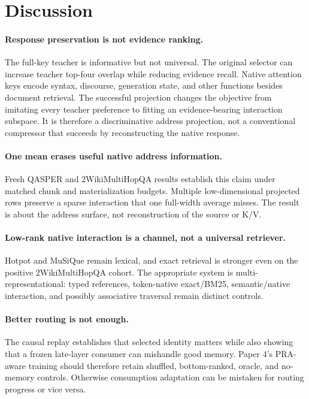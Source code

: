 \documentclass[11pt]{article}
\newcommand{\kv}{\textsc{K/V}\xspace}
\newcommand{\twowiki}{2WikiMultiHopQA\xspace}
\newcommand{\musique}{MuSiQue\xspace}
\begin{document}
\section{Discussion}
\paragraph{Response preservation is not evidence ranking.}
The full-key teacher is informative but not universal. The original selector
can increase teacher top-four overlap while reducing evidence recall. Native
attention keys encode syntax, discourse, generation state, and other functions
besides document retrieval. The successful projection changes the objective
from imitating every teacher preference to fitting an evidence-bearing
interaction subspace. It is therefore a discriminative address projection, not
a conventional compressor that succeeds by reconstructing the native response.

\paragraph{One mean erases useful native address information.}
Fresh QASPER and \twowiki results establish this claim under matched chunk and
materialization budgets. Multiple low-dimensional projected rows preserve a
sparse interaction that one full-width average misses. The result is about the
address surface, not reconstruction of the source or \kv.

\paragraph{Low-rank native interaction is a channel, not a universal retriever.}
Hotpot and \musique remain lexical, and exact retrieval is stronger even on
the positive \twowiki cohort. The appropriate system is multi-representational:
typed references, token-native exact/BM25, semantic/native interaction, and
possibly associative traversal remain distinct controls.

\paragraph{Better routing is not enough.}
The causal replay establishes that selected identity matters while also showing
that a frozen late-layer consumer can mishandle good memory. Paper 4's
PRA-aware training should therefore retain shuffled, bottom-ranked, oracle, and
no-memory controls. Otherwise consumption adaptation can be mistaken for
routing progress or vice versa.
\end{document}
